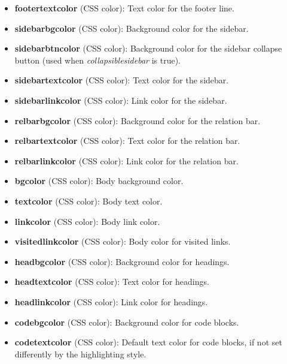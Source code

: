\documentclass[letterpaper,10pt,english]{sphinxmanual}
\begin{document}
\begin{itemize}
\begin{itemize}
\item {} 
\textbf{footertextcolor} (CSS color): Text color for the footer line.

\item {} 
\textbf{sidebarbgcolor} (CSS color): Background color for the sidebar.

\item {} 
\textbf{sidebarbtncolor} (CSS color): Background color for the sidebar collapse
button (used when \emph{collapsiblesidebar} is true).

\item {} 
\textbf{sidebartextcolor} (CSS color): Text color for the sidebar.

\item {} 
\textbf{sidebarlinkcolor} (CSS color): Link color for the sidebar.

\item {} 
\textbf{relbarbgcolor} (CSS color): Background color for the relation bar.

\item {} 
\textbf{relbartextcolor} (CSS color): Text color for the relation bar.

\item {} 
\textbf{relbarlinkcolor} (CSS color): Link color for the relation bar.

\item {} 
\textbf{bgcolor} (CSS color): Body background color.

\item {} 
\textbf{textcolor} (CSS color): Body text color.

\item {} 
\textbf{linkcolor} (CSS color): Body link color.

\item {} 
\textbf{visitedlinkcolor} (CSS color): Body color for visited links.

\item {} 
\textbf{headbgcolor} (CSS color): Background color for headings.

\item {} 
\textbf{headtextcolor} (CSS color): Text color for headings.

\item {} 
\textbf{headlinkcolor} (CSS color): Link color for headings.

\item {} 
\textbf{codebgcolor} (CSS color): Background color for code blocks.

\item {} 
\textbf{codetextcolor} (CSS color): Default text color for code blocks, if not
set differently by the highlighting style.


\end{itemize}
\end{itemize}
\end{document}
